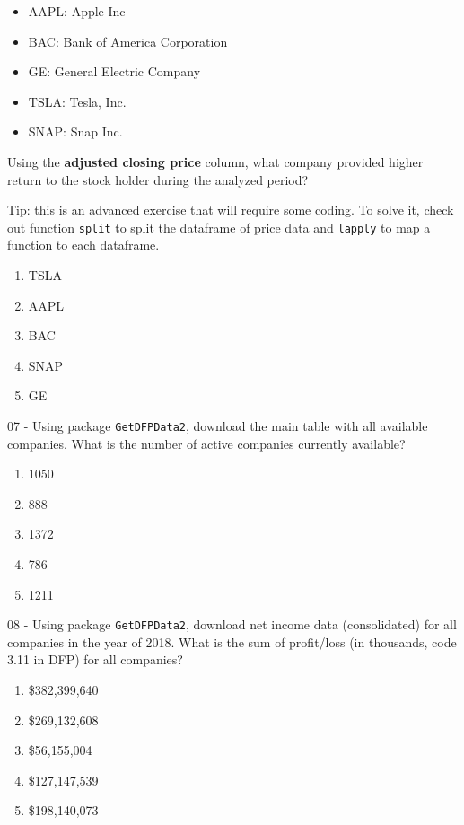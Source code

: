 \documentclass[
  11pt,
]{book}
\providecommand{\tightlist}{%
  \setlength{\itemsep}{0pt}\setlength{\parskip}{0pt}}
\begin{document}
\begin{itemize}
\tightlist
\item
  AAPL: Apple Inc
\item
  BAC: Bank of America Corporation
\item
  GE: General Electric Company
\item
  TSLA: Tesla, Inc.
\item
  SNAP: Snap Inc.
\end{itemize}

Using the \textbf{adjusted closing price} column, what company provided higher return to the stock holder during the analyzed period?

Tip: this is an advanced exercise that will require some coding. To solve it, check out function \texttt{split} to split the dataframe of price data and \texttt{lapply} to map a function to each dataframe.

\begin{enumerate}
\def\labelenumi{\alph{enumi})}
\tightlist
\item
  TSLA
\item
  AAPL
\item
  BAC
\item
  SNAP
\item
  GE
\end{enumerate}

07 -
Using package \texttt{GetDFPData2}, download the main table with all available companies. What is the number of active companies currently available?

\begin{enumerate}
\def\labelenumi{\alph{enumi})}
\tightlist
\item
  1050
\item
  888
\item
  1372
\item
  786
\item
  1211
\end{enumerate}

08 -
Using package \texttt{GetDFPData2}, download net income data (consolidated) for all companies in the year of 2018. What is the sum of profit/loss (in thousands, code 3.11 in DFP) for all companies?

\begin{enumerate}
\def\labelenumi{\alph{enumi})}
\tightlist
\item
  \$382,399,640
\item
  \$269,132,608
\item
  \$56,155,004
\item
  \$127,147,539
\item
  \$198,140,073
\end{enumerate}
\end{document}
